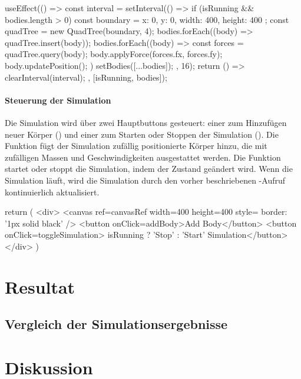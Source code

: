 \documentclass[a4paper,12pt,twoside]{article}
\begin{document}
\begin{javascript}
useEffect(() => {
    const interval = setInterval(() => {
        if (isRunning && bodies.length > 0) {
            const boundary = { x: 0, y: 0, width: 400, height: 400 };
            const quadTree = new QuadTree(boundary, 4);
            bodies.forEach((body) => quadTree.insert(body));
            bodies.forEach((body) => {
                const forces = quadTree.query(body);
                body.applyForce(forces.fx, forces.fy);
                body.updatePosition();
            })
            setBodies([...bodies]);
        }
    }, 16);
    return () => clearInterval(interval);
}, [isRunning, bodies]);
\end{javascript}


\paragraph{Steuerung der Simulation}
Die Simulation wird über zwei Hauptbuttons gesteuert: einer zum Hinzufügen neuer Körper () und einer zum Starten oder Stoppen der Simulation (). Die Funktion  fügt der Simulation zufällig positionierte Körper hinzu, die mit zufälligen Massen und Geschwindigkeiten ausgestattet werden. Die Funktion  startet oder stoppt die Simulation, indem der Zustand  geändert wird. Wenn die Simulation läuft, wird die Simulation durch den vorher beschriebenen -Aufruf kontinuierlich aktualisiert.
\begin{javascript}
	return (
        <div>
            <canvas ref={canvasRef} width={400} height={400} style={{ border: '1px solid black' }} />
            <button onClick={addBody}>Add Body</button>
            <button onClick={toggleSimulation}> {isRunning ? 'Stop' : 'Start'} Simulation</button>
        </div>
    )
\end{javascript}


\section{Resultat}
\subsection{Vergleich der Simulationsergebnisse}

\section{Diskussion}
\end{document}
